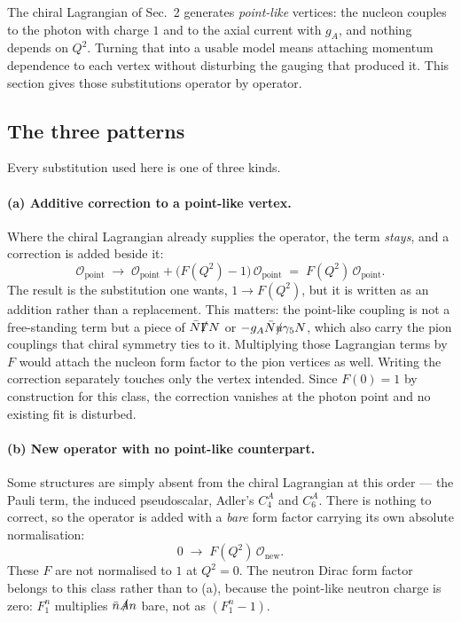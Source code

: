 \documentclass[11pt,a4paper]{article}
\begin{document}
The chiral Lagrangian of Sec.~2 generates \emph{point-like} vertices: the
nucleon couples to the photon with charge $1$ and to the axial current with
$g_A$, and nothing depends on $Q^2$. Turning that into a usable model means
attaching momentum dependence to each vertex without disturbing the gauging that
produced it. This section gives those substitutions operator by operator.

\subsection{The three patterns}

Every substitution used here is one of three kinds.

\paragraph{(a) Additive correction to a point-like vertex.}
Where the chiral Lagrangian already supplies the operator, the term
\emph{stays}, and a correction is added beside it:
\begin{equation}
  \mathcal{O}_{\text{point}}
  \;\longrightarrow\;
  \mathcal{O}_{\text{point}} + \big(F(Q^2)-1\big)\,\mathcal{O}_{\text{point}}
  \;=\; F(Q^2)\,\mathcal{O}_{\text{point}} .
  \label{eq:pattern-a}
\end{equation}
The result is the substitution one wants, $1 \to F(Q^2)$, but it is written as an
addition rather than a replacement. This matters: the point-like coupling is not
a free-standing term but a piece of $\bar N \slashed\Gamma N$ or
$-g_A \bar N \slashed u \gamma_5 N$, which also carry the pion couplings that
chiral symmetry ties to it. Multiplying those Lagrangian terms by $F$ would
attach the nucleon form factor to the pion vertices as well. Writing the
correction separately touches only the vertex intended. Since $F(0)=1$ by
construction for this class, the correction vanishes at the photon point and no
existing fit is disturbed.

\paragraph{(b) New operator with no point-like counterpart.}
Some structures are simply absent from the chiral Lagrangian at this order — the
Pauli term, the induced pseudoscalar, Adler's $C_4^A$ and $C_6^A$. There is
nothing to correct, so the operator is added with a \emph{bare} form factor
carrying its own absolute normalisation:
\begin{equation}
  0 \;\longrightarrow\; F(Q^2)\,\mathcal{O}_{\text{new}} .
  \label{eq:pattern-b}
\end{equation}
These $F$ are not normalised to $1$ at $Q^2=0$. The neutron Dirac form factor
belongs to this class rather than to (a), because the point-like neutron charge
is zero: $F_1^n$ multiplies $\bar n \slashed A n$ bare, not as
$(F_1^n - 1)$.
\end{document}
